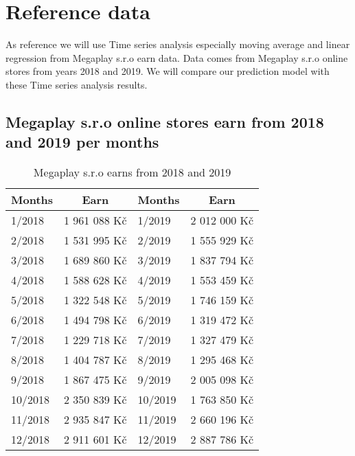 
\chapter{Reference data} \label{reference_data}

As reference we will use Time series analysis especially moving average and linear regression from Megaplay s.r.o earn data. Data comes from Megaplay s.r.o online stores from years 2018 and 2019.
We will compare  our prediction model with these Time series analysis results.
\section{Megaplay s.r.o online stores earn from 2018 and 2019 per months}
\begin{table}[h!]
    \begin{center}
        \begin{tabular}{ | l | c | l | c |}
            \hline
            \textbf{Months} & \textbf{Earn} & \textbf{Months} & \textbf{Earn}\\
            \hline
            1/2018 & 1 961 088 Kč & 1/2019 & 2 012 000 Kč \\
            \hline
            2/2018 & 1 531 995 Kč & 2/2019 & 1 555 929 Kč\\
            \hline
            3/2018 & 1 689 860 Kč & 3/2019 & 1 837 794 Kč \\
            \hline
            4/2018 & 1 588 628 Kč & 4/2019 & 1 553 459 Kč\\
            \hline
            5/2018 & 1 322 548 Kč &5/2019 & 1 746 159 Kč\\
            \hline
            6/2018 & 1 494 798 Kč & 6/2019 & 1 319 472 Kč\\
            \hline
            7/2018 & 1 229 718 Kč & 7/2019 & 1 327 479 Kč\\
            \hline
            8/2018 & 1 404 787 Kč & 8/2019 & 1 295 468 Kč\\
            \hline
            9/2018 & 1 867 475 Kč & 9/2019 & 2 005 098 Kč\\
            \hline
            10/2018 & 2 350 839 Kč & 10/2019 & 1 763 850 Kč\\
            \hline
            11/2018 & 2 935 847 Kč & 11/2019 & 2 660 196 Kč\\
            \hline
            12/2018 & 2 911 601 Kč & 12/2019 & 2 887 786 Kč\\
            \hline
        \end{tabular}
    \end{center}
    \caption{Megaplay s.r.o earns from 2018 and 2019}
    \label{income_megaplay}
\end{table}
